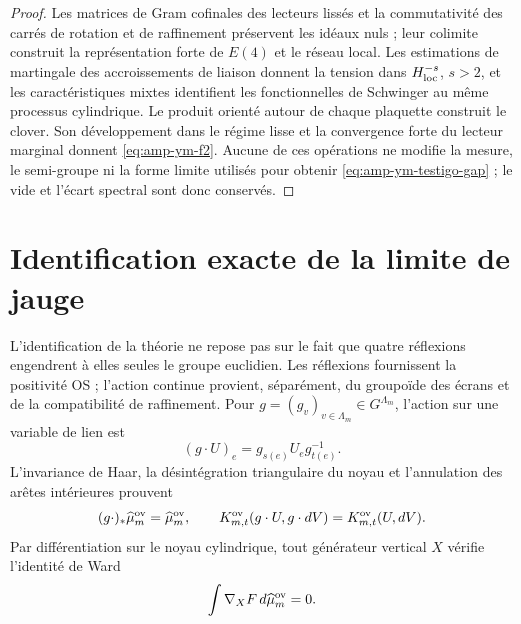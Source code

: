 \begin{proof}
Les matrices de Gram cofinales des lecteurs lissés et la commutativité des carrés de rotation et de raffinement préservent les idéaux nuls ; leur colimite construit la représentation forte de \(E(4)\) et le réseau local. Les estimations de martingale des accroissements de liaison donnent la tension dans \(H^{-s}_{\rm loc}\), \(s>2\), et les caractéristiques mixtes identifient les fonctionnelles de Schwinger au même processus cylindrique. Le produit orienté autour de chaque plaquette construit le clover. Son développement dans le régime lisse et la convergence forte du lecteur marginal donnent \eqref{eq:amp-ym-f2}. Aucune de ces opérations ne modifie la mesure, le semi-groupe ni la forme limite utilisés pour obtenir \eqref{eq:amp-ym-testigo-gap} ; le vide et l'écart spectral sont donc conservés.
\end{proof}

\section*{Identification exacte de la limite de jauge}

L’identification de la théorie ne repose pas sur le fait que quatre réflexions
engendrent à elles seules le groupe euclidien. Les réflexions fournissent la
positivité OS ; l’action continue provient, séparément, du groupoïde des
écrans et de la compatibilité de raffinement. Pour
\(g=(g_v)_{v\in\Lambda_m}\in G^{\Lambda_m}\), l’action sur une variable
de lien est
\begin{equation}\label{eq:amp-ym-accion-gauge-enlace}
 (g\cdot U)_e=g_{s(e)}U_e g_{t(e)}^{-1}.
\end{equation}
L’invariance de Haar, la désintégration triangulaire du noyau et
l’annulation des arêtes intérieures prouvent
\begin{equation}\label{eq:amp-ym-invariancia-gauge-medida}
 (g\cdot)_*\widehat\mu_m^{\rm ov}=\widehat\mu_m^{\rm ov},
 \qquad
 K_{m,t}^{\rm ov}(g\cdot U,g\cdot dV)
 =K_{m,t}^{\rm ov}(U,dV).
\end{equation}
Par différentiation sur le noyau cylindrique, tout générateur vertical
\(X\) vérifie l’identité de Ward
\begin{equation}\label{eq:amp-ym-ward}
 \int \nabla_XF\,d\widehat\mu_m^{\rm ov}=0.
\end{equation}

